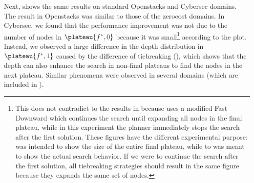 Next,  shows the same results on standard
Openstacks and Cybersec domains.
The result in Openstacks was similar to those of the zerocost domains.
In Cybersec,
we found that the performance improvement was not due to the number of nodes in $\plateau{f^*,0}$ because it was small\footnote{This does not contradict to the results in  because  uses a modified Fast Downward which continues the search until expanding all nodes in the final plateau, while in this experiment the planner immediately stops the search after the first solution. These figures have the different experimental purpose:  was intended to show the size of the entire final plateau, while  to  was meant to show the actual search behavior. If we were to continue the search after the first solution, all tiebreaking strategies should result in the same figure because they expands the same set of nodes.} according to the plot.
Instead, we observed a large difference in the depth distribution in $\plateau{f^*,1}$ caused by the difference of tiebreaking (), which shows that the depth can also enhance the search in non-final plateaus to find the nodes in the next plateau.
Similar phenomena were observed in several domains (which are included in ).



